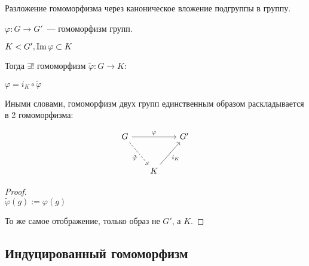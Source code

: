 \begin{theorem-non}
    Разложение гомоморфизма через каноническое вложение подгруппы в группу. 

    $\varphi: G \to G'$~--- гомоморфизм групп.

    $K < G', \operatorname{Im} \varphi \subset K$

    Тогда $\exists !$ гомоморфизм $\tilde{\varphi}: G \to K:$

    $\varphi = i_K \circ \tilde{\varphi}$

    Иными словами, гомоморфизм двух групп единственным образом раскладывается в 2 гомоморфизма:


    \[
    \begin{tikzcd}[row sep=large, column sep=scriptsize]
        G \arrow{rr}{\varphi} \arrow[swap, dashed]{rd}{\tilde{\varphi}} & & G' \\
            & K \arrow[swap]{ru}{i_K} & 
    \end{tikzcd}
    \]

    \begin{proof}
        $ $ \\
        $\tilde{\varphi}(g) := \varphi(g)$
        
        То же самое отображение, только образ не $G'$, а $K$.
        
    \end{proof}
\end{theorem-non}

\subsection*{Индуцированный гомоморфизм}

